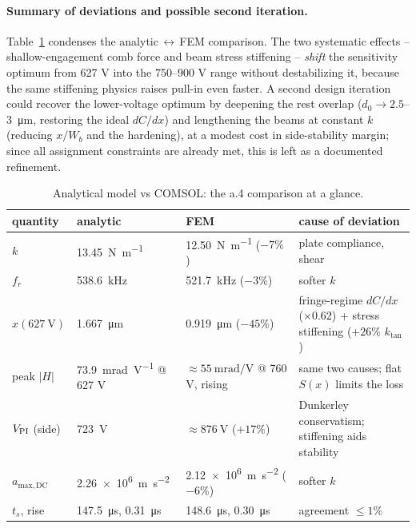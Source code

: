 \paragraph{Summary of deviations and possible second iteration.}
Table~\ref{tab:p3dev} condenses the analytic$\,\leftrightarrow\,$FEM
comparison. The two systematic effects -- shallow-engagement comb force and
beam stress stiffening -- \emph{shift} the sensitivity optimum from 627 V
into the 750--900 V range without destabilizing it, because the same
stiffening physics raises pull-in even faster. A second design iteration
could recover the lower-voltage optimum by deepening the rest overlap
($d_{0}\to2.5$--\SI{3}{\micro\meter}, restoring the ideal $dC/dx$) and
lengthening the beams at constant $k$ (reducing $x/W_{b}$ and the
hardening), at a modest cost in side-stability margin; since all assignment
constraints are already met, this is left as a documented refinement.

\begin{table}[H]
\centering
\small
\caption{Analytical model vs COMSOL: the a.4 comparison at a glance.}
\label{tab:p3dev}
\begin{tabularx}{\textwidth}{lllX}
\toprule
quantity & analytic & FEM & cause of deviation\\
\midrule
$k$ & \SI{13.45}{\newton\per\meter} & \SI{12.50}{\newton\per\meter} ($-7\%$) & plate compliance, shear\\
$f_{r}$ & \SI{538.6}{\kilo\hertz} & \SI{521.7}{\kilo\hertz} ($-3\%$) & softer $k$\\
$x(\SI{627}{\volt})$ & \SI{1.667}{\micro\meter} & \SI{0.919}{\micro\meter} ($-45\%$) & fringe-regime $dC/dx$ ($\times0.62$) + stress stiffening ($+26\%$ $k_{\mathrm{tan}}$)\\
peak $|H|$ & \SI{73.9}{\milli\radian\per\volt} @ 627 V & $\approx\SI{55}{\milli\radian\per\volt}$ @ 760 V, rising & same two causes; flat $S(x)$ limits the loss\\
$V_{\mathrm{PI}}$ (side) & \SI{723}{\volt} & $\approx\SI{876}{\volt}$ ($+17\%$) & Dunkerley conservatism; stiffening aids stability\\
$a_{\mathrm{max,DC}}$ & \SI{2.26e6}{\meter\per\second\squared} & \SI{2.12e6}{\meter\per\second\squared} ($-6\%$) & softer $k$\\
$t_{s}$, rise & \SI{147.5}{\micro\second}, \SI{0.31}{\micro\second} & \SI{148.6}{\micro\second}, \SI{0.30}{\micro\second} & agreement $\le1\%$\\
\bottomrule
\end{tabularx}
\end{table}

